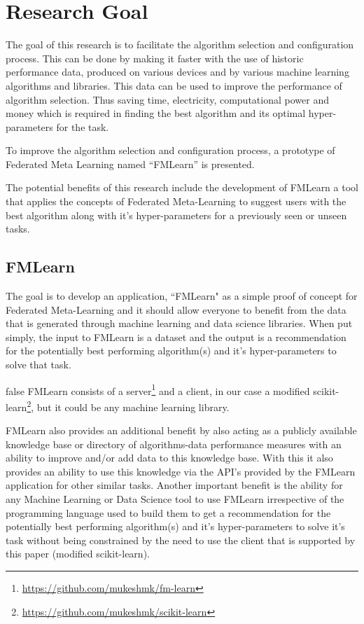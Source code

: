 \section{Research Goal}
The goal of this research is to facilitate the algorithm selection and configuration process. This can be done by making it faster with the use of historic performance data, produced on various devices and by various machine learning algorithms and libraries. This data can be used to improve the performance of algorithm selection. Thus saving time, electricity, computational power and money which is required in finding the best algorithm and its optimal hyper-parameters for the task.

To improve the algorithm selection and configuration process, a prototype of Federated Meta Learning named “FMLearn” is presented.

The potential benefits of this research include the development of FMLearn a tool that applies the concepts of Federated Meta-Learning to suggest users with the best algorithm along with it's hyper-parameters for a previously seen or unseen tasks.

\subsection{FMLearn}
The goal is to develop an application, “FMLearn" as a simple proof of concept for Federated Meta-Learning and it should allow everyone to benefit from the data that is generated through machine learning and data science libraries. When put simply, the input to FMLearn is a dataset and the output is a recommendation for the potentially best performing algorithm(s) and it's hyper-parameters to solve that task.

\if false
FMLearn consists of a server\footnote{\url{https://github.com/mukeshmk/fm-learn}} and a client, in our case a modified scikit-learn\footnote{\url{https://github.com/mukeshmk/scikit-learn}}, but it could be any machine learning library.
\fi

FMLearn also provides an additional benefit by also acting as a publicly available knowledge base or directory of algorithms-data performance measures with an ability to improve and/or add data to this knowledge base. With this it also provides an ability to use this knowledge via the API's provided by the FMLearn application for other similar tasks. Another important benefit is the ability for any Machine Learning or Data Science tool to use FMLearn irrespective of the programming language used to build them to get a recommendation for the potentially best performing algorithm(s) and it's hyper-parameters to solve it's task without being constrained by the need to use the client that is supported by this paper (modified scikit-learn).


